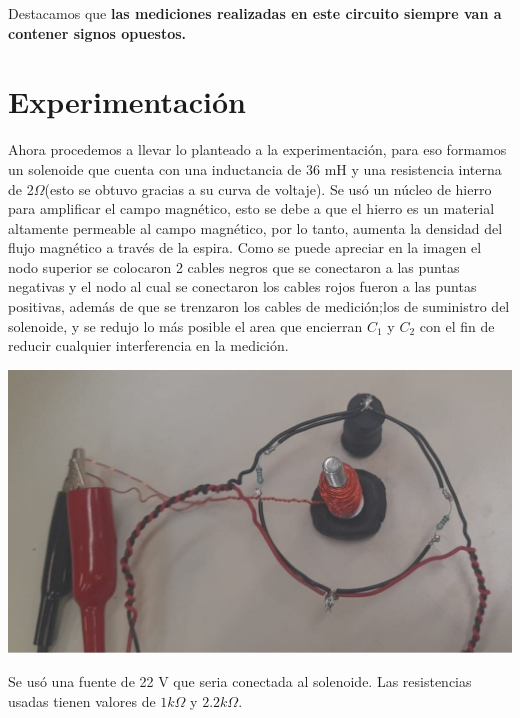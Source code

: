 \documentclass[a0,portrait]{a0poster}
\begin{document}
\begin{multicols}{2}
\noindent Destacamos que \textbf{las mediciones realizadas en este circuito siempre van a contener signos opuestos.}

\section*{Experimentación}

\noindent Ahora procedemos a llevar lo planteado a la experimentación, para eso formamos un solenoide  que cuenta con una inductancia de 36 mH y una resistencia interna de 2$\Omega$(esto se obtuvo gracias a su curva de voltaje). Se usó un núcleo  de hierro para amplificar el campo magnético, esto se debe a que el hierro es un material altamente permeable al campo magnético, por lo tanto, aumenta la densidad del flujo magnético a través de la espira. Como se puede apreciar en la imagen el nodo superior se colocaron 2 cables negros que se conectaron a las puntas negativas y el nodo al cual se conectaron los cables rojos fueron a las puntas positivas, además de que se trenzaron los cables de medición;los de suministro del solenoide, y se redujo lo más posible el area que encierran $C_1$ y $C_2$ con el fin de reducir cualquier interferencia en la medición.

\begin{center}\vspace{0.4cm}
\includegraphics[scale=0.5]{Circuito2.jpg}
\end{center}\vspace{0.4cm} 


\noindent Se usó una fuente de 22 V que seria conectada al solenoide. Las resistencias usadas tienen valores de $1k\Omega$ y $2.2k\Omega$.


\end{multicols}
\end{document}
